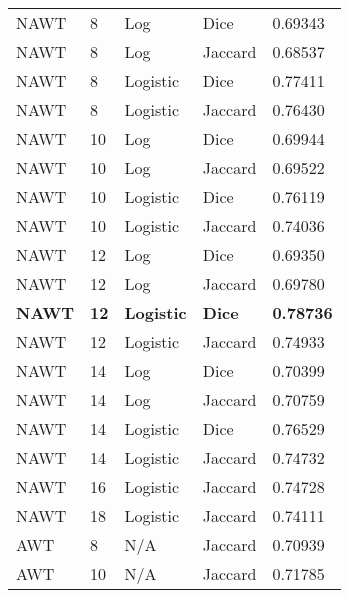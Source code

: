\documentclass{article}
\begin{document}
   \begin{center}
      \scriptsize
      
      \tablelasttail{\hline}

         \begin{supertabular}{| l | l | l | l | l |}
               NAWT & 8 & Log & Dice & 0.69343 \\
               NAWT & 8 & Log & Jaccard & 0.68537 \\
               NAWT & 8 & Logistic & Dice & 0.77411 \\
               NAWT & 8 & Logistic & Jaccard & 0.76430 \\
               NAWT & 10 & Log & Dice & 0.69944 \\
               NAWT & 10 & Log & Jaccard & 0.69522 \\
               NAWT & 10 & Logistic & Dice & 0.76119 \\
               NAWT & 10 & Logistic & Jaccard & 0.74036 \\
               NAWT & 12 & Log & Dice & 0.69350 \\
               NAWT & 12 & Log & Jaccard & 0.69780 \\
               \textbf{NAWT} & \textbf{12} & \textbf{Logistic} & \textbf{Dice} & \textbf{0.78736} \\
               NAWT & 12 & Logistic & Jaccard & 0.74933 \\
               NAWT & 14 & Log & Dice & 0.70399 \\
               NAWT & 14 & Log & Jaccard & 0.70759 \\
               NAWT & 14 & Logistic & Dice & 0.76529 \\
               NAWT & 14 & Logistic & Jaccard & 0.74732 \\
               NAWT & 16 & Logistic & Jaccard & 0.74728 \\
               NAWT & 18 & Logistic & Jaccard & 0.74111 \\
               AWT & 8 & N/A & Jaccard & 0.70939 \\
               AWT & 10 & N/A & Jaccard & 0.71785 \\

\end{supertabular}
\end{center}
\end{document}
